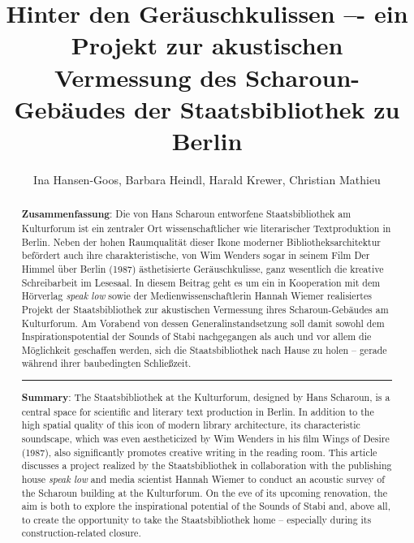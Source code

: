 \documentclass[a4paper,
fontsize=11pt,
oneside,
numbers=noperiodatend,
parskip=half-,
bibliography=totoc,
final
]{scrartcl}
\title{\LARGE{Hinter den Geräuschkulissen –- ein Projekt zur akustischen Vermessung des Scharoun-Gebäudes der Staatsbibliothek zu Berlin}} %
\author{Ina Hansen-Goos, Barbara Heindl, Harald Krewer, Christian Mathieu}
\date{}
\begin{document}
\maketitle
\thispagestyle{fancyplain} 

\begin{abstract}
\noindent
\textbf{Zusammenfassung}: Die von Hans Scharoun entworfene
Staatsbibliothek am Kulturforum ist ein zentraler Ort wissenschaftlicher
wie literarischer Textproduktion in Berlin. Neben der hohen Raumqualität
dieser Ikone moderner Bibliotheksarchitektur befördert auch ihre
charakteristische, von Wim Wenders sogar in seinem Film Der Himmel über
Berlin (1987) ästhetisierte Geräuschkulisse, ganz wesentlich die
kreative Schreibarbeit im Lesesaal. In diesem Beitrag geht es um ein in
Kooperation mit dem Hörverlag \textit{speak low} sowie der
Medienwissenschaftlerin Hannah Wiemer realisiertes Projekt der
Staatsbibliothek zur akustischen Vermessung ihres Scharoun-Gebäudes am
Kulturforum. Am Vorabend von dessen Generalinstandsetzung soll damit
sowohl dem Inspirationspotential der Sounds of Stabi nachgegangen als
auch und vor allem die Möglichkeit geschaffen werden, sich die
Staatsbibliothek nach Hause zu holen -- gerade während ihrer
baubedingten Schließzeit.

\begin{center}\rule{0.5\linewidth}{0.5pt}\end{center}

\textbf{Summary}: The Staatsbibliothek at the Kulturforum, designed by
Hans Scharoun, is a central space for scientific and literary text
production in Berlin. In addition to the high spatial quality of this
icon of modern library architecture, its characteristic soundscape,
which was even aestheticized by Wim Wenders in his film Wings of Desire
(1987), also significantly promotes creative writing in the reading
room. This article discusses a project realized by the Staatsbibliothek
in collaboration with the publishing house \textit{speak low} and media scientist
Hannah Wiemer to conduct an acoustic survey of the Scharoun building at
the Kulturforum. On the eve of its upcoming renovation, the aim is both
to explore the inspirational potential of the Sounds of Stabi and, above
all, to create the opportunity to take the Staatsbibliothek home --
especially during its construction-related closure.
\end{abstract}
\end{document}
